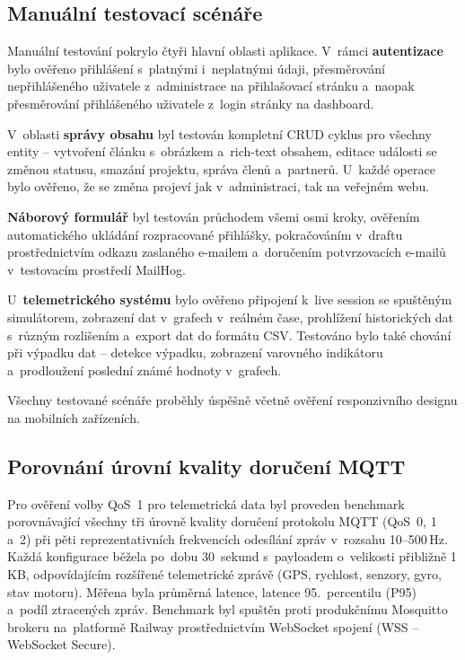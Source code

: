 \subsection{Manuální testovací scénáře}

Manuální testování pokrylo čtyři hlavní oblasti aplikace. V~rámci \textbf{autentizace} bylo ověřeno přihlášení s~platnými i~neplatnými údaji, přesměrování nepřihlášeného uživatele z~administrace na přihlašovací stránku a~naopak přesměrování přihlášeného uživatele z~login stránky na dashboard.

V~oblasti \textbf{správy obsahu} byl testován kompletní CRUD cyklus pro všechny entity -- vytvoření článku s~obrázkem a~rich-text obsahem, editace události se změnou statusu, smazání projektu, správa členů a~partnerů. U~každé operace bylo ověřeno, že se změna projeví jak v~administraci, tak na veřejném webu.

\textbf{Náborový formulář} byl testován průchodem všemi osmi kroky, ověřením automatického ukládání rozpracované přihlášky, pokračováním v~draftu prostřednictvím odkazu zaslaného e-mailem a~doručením potvrzovacích e-mailů v~testovacím prostředí MailHog.

U~\textbf{telemetrického systému} bylo ověřeno připojení k~live session se spuštěným simulátorem, zobrazení dat v~grafech v~reálném čase, prohlížení historických dat s~různým rozlišením a~export dat do formátu CSV. Testováno bylo také chování při výpadku dat -- detekce výpadku, zobrazení varovného indikátoru a~prodloužení poslední známé hodnoty v~grafech.

Všechny testované scénáře proběhly úspěšně včetně ověření responzivního designu na mobilních zařízeních.

\subsection{Porovnání úrovní kvality doručení MQTT}
\label{sec:qos-benchmark}

\begin{sloppypar}
Pro ověření volby QoS~1 pro telemetrická data byl proveden benchmark porovnávající všechny tři úrovně kvality doručení protokolu MQTT (QoS~0, 1 a~2) při pěti reprezentativních frekvencích odesílání zpráv v~rozsahu 10--500\,Hz. Každá konfigurace běžela po~dobu 30~sekund s~payloadem o~velikosti přibližně 1\,KB, odpovídajícím rozšířené telemetrické zprávě (GPS, rychlost, senzory, gyro, stav motoru). Měřena byla průměrná latence, latence 95.~percentilu (P95) a~podíl ztracených zpráv. Benchmark byl spuštěn proti produkčnímu Mosquitto brokeru na~platformě Railway prostřednictvím WebSocket spojení (WSS -- WebSocket Secure).
\end{sloppypar}

